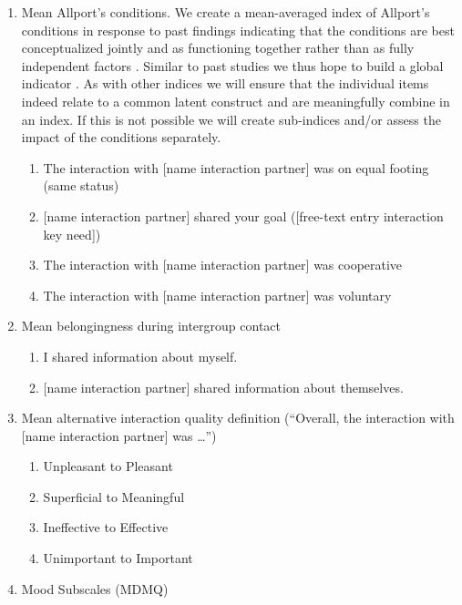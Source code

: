 \documentclass[]{article}
\providecommand{\tightlist}{%
\setlength{\itemsep}{0pt}\setlength{\parskip}{0pt}}
\begin{document}
\begin{enumerate}
\def\labelenumi{\arabic{enumi}.}
\tightlist
\item
  Mean Allport's conditions. We create a mean-averaged index of
  Allport's conditions in response to past findings indicating that the
  conditions are best conceptualized jointly and as functioning together
  rather than as fully independent factors
  \citep[p.~766]{Pettigrew2006}. Similar to past studies we thus hope to
  build a global indicator \citep[e.g., see][]{Pettigrew2006}. As with
  other indices we will ensure that the individual items indeed relate
  to a common latent construct and are meaningfully combine in an
  index. If this is not possible we will create sub-indices and/or
  assess the impact of the conditions separately.

  \begin{enumerate}
  \def\labelenumii{\alph{enumii}.}
  \tightlist
  \item
    The interaction with {[}name interaction partner{]} was on equal
    footing (same status)
  \item
    {[}name interaction partner{]} shared your goal ({[}free-text entry
    interaction key need{]})
  \item
    The interaction with {[}name interaction partner{]} was cooperative
  \item
    The interaction with {[}name interaction partner{]} was voluntary
  \end{enumerate}
\item
  Mean belongingness during intergroup contact

  \begin{enumerate}
  \def\labelenumii{\alph{enumii}.}
  \tightlist
  \item
    I shared information about myself.
  \item
    {[}name interaction partner{]} shared information about themselves.
  \end{enumerate}
\item
  Mean alternative interaction quality definition (``Overall, the
  interaction with {[}name interaction partner{]} was \ldots{}'')

  \begin{enumerate}
  \def\labelenumii{\alph{enumii}.}
  \tightlist
  \item
    Unpleasant to Pleasant
  \item
    Superficial to Meaningful
  \item
    Ineffective to Effective
  \item
    Unimportant to Important
  \end{enumerate}
\item
  Mood Subscales (MDMQ)


\end{enumerate}
\end{document}
